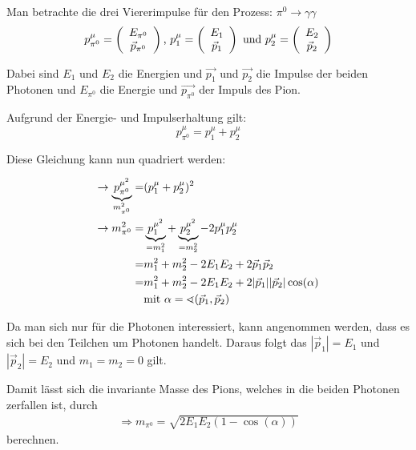\documentclass[a4paper,11pt,oneside,final,german,openbib,pdftex]{scrbook}
\begin{document}
{\begin{appendix}
Man betrachte die drei Viererimpulse f\"ur den Prozess: $\pi^0\rightarrow \gamma\gamma $
\begin{equation}
p_{\pi^0}^{\mu}=\left(\begin{array}{c}E_{\pi^0}\\\vec{p}_{\pi^0}\end{array}\right) \textnormal{,  }
p_{1}^{\mu}=\left(\begin{array}{c}E_{1}\\\vec{p}_{1}\end{array}\right) \textnormal{ und  } p_{2}^{\mu}=\left(\begin{array}{c}E_{2}\\\vec{p}_{2}\end{array}\right)
\end{equation}

Dabei sind $E_{1}$ und $E_{2}$ die Energien und $\vec{p_{1}}$ und $\vec{p_{2}}$ die Impulse der beiden Photonen und $E_{\pi^0}$ die Energie und $\vec{p_{\pi^0}}$ der Impuls des Pion.

Aufgrund der Energie- und Impulserhaltung gilt:
\begin{equation}
p^{\mu}_{\pi^0} = p^{\mu}_1 + p^{\mu}_2
\end{equation}

Diese Gleichung kann nun quadriert werden:

\begin{equation}
\begin{split}
\rightarrow \underbrace{p^{\mu^2}_{\pi^0}}_{m_{\pi^0}^2}=& (p_{1}^{\mu}+p_{2}^{\mu})^2 \\ 
\rightarrow m_{\pi^0}^2=& \underbrace{p_{1}^{\mu^2}}_{=m_1^2}+\underbrace{p_{2}^{\mu^2}}_{=m_2^2}-2p_{1}^{\mu}p_{2}^{\mu} \\ 
=& m_1^2+m_2^2-2E_1E_2+2\vec{p}_1\vec{p}_2 \\ 
=& m_1^2+m_2^2-2E_1E_2+2|\vec{p}_1| |\vec{p}_2| \cos(\alpha) \\
&\textnormal{mit } \alpha=\sphericalangle(\vec{p}_1,\vec{p}_2)
\end{split}
\end{equation}

Da man sich nur f\"ur die Photonen interessiert, kann angenommen werden, dass es sich bei den Teilchen um Photonen handelt. Daraus folgt das $|\vec{p}_1|=E_1$ und $|\vec{p}_2|=E_2$ und $m_1=m_2=0$ gilt.

Damit lässt sich die invariante Masse des Pions, welches in die beiden Photonen zerfallen ist, durch
\begin{equation}
\begin{split}
\Rightarrow{m_{\pi^0}=\sqrt{2E_1E_2(1-\cos(\alpha))}}
\label{eq:Formel-zur-Berechnung-der-Invariante-Masse-Herleitung}
\end{split}
\end{equation}
berechnen.


\end{appendix}}
\end{document}
